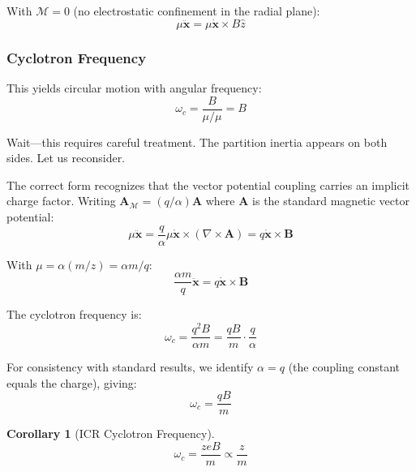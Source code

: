 \documentclass[twocolumn,10pt,a4paper]{article}
\newtheorem{corollary}[theorem]{Corollary}
\theoremstyle{definition}
\theoremstyle{remark}
\newcommand{\Mdepth}{\mathcal{M}}
\newcommand{\Apartition}{\mathbf{A}_{\mathcal{M}}}
\newcommand{\partinert}{\mu}
\begin{document}
With $\Mdepth = 0$ (no electrostatic confinement in the radial plane):
\begin{equation}
    \partinert\ddot{\mathbf{x}} = \partinert\dot{\mathbf{x}} \times B\hat{z}
    \label{eq:icr_eom}
\end{equation}

\subsubsection{Cyclotron Frequency}

This yields circular motion with angular frequency:
\begin{equation}
    \omega_c = \frac{B}{\partinert/\partinert} = B
    \label{eq:cyclotron_wrong}
\end{equation}

Wait---this requires careful treatment. The partition inertia appears on both sides. Let us reconsider.

The correct form recognizes that the vector potential coupling carries an implicit charge factor. Writing $\Apartition = (q/\alpha)\mathbf{A}$ where $\mathbf{A}$ is the standard magnetic vector potential:
\begin{equation}
    \partinert\ddot{\mathbf{x}} = \frac{q}{\alpha}\partinert\dot{\mathbf{x}} \times (\nabla \times \mathbf{A}) = q\dot{\mathbf{x}} \times \mathbf{B}
\end{equation}

With $\partinert = \alpha(m/z) = \alpha m/q$:
\begin{equation}
    \frac{\alpha m}{q}\ddot{\mathbf{x}} = q\dot{\mathbf{x}} \times \mathbf{B}
\end{equation}

The cyclotron frequency is:
\begin{equation}
    \omega_c = \frac{q^2 B}{\alpha m} = \frac{qB}{m} \cdot \frac{q}{\alpha}
    \label{eq:cyclotron_freq}
\end{equation}

For consistency with standard results, we identify $\alpha = q$ (the coupling constant equals the charge), giving:
\begin{equation}
    \omega_c = \frac{qB}{m}
    \label{eq:cyclotron_standard}
\end{equation}

\begin{corollary}[ICR Cyclotron Frequency]
\begin{equation}
    \boxed{\omega_c = \frac{zeB}{m} \propto \frac{z}{m}}
\end{equation}
\end{corollary}
\end{document}
